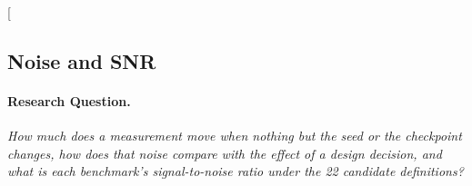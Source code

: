\clearpage
\twocolumn[{%
\rqparent
\subsection{Noise and SNR}
\label{app:rq03_noise_and_snr}

\noindent\begin{minipage}[t]{0.485\textwidth}
\vspace{0pt}
\paragraph{Research Question.} \emph{How much does a measurement move when nothing but the seed or the checkpoint changes, how does that noise compare with the effect of a design decision, and what is each benchmark's signal-to-noise ratio under the 22 candidate definitions?}


\end{minipage}}
